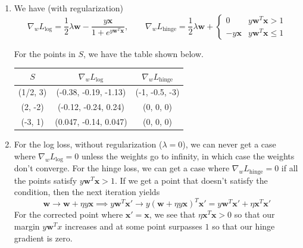\documentclass[12pt]{article}
\newcommand{\x}{\mathbf x}
\newcommand{\w}{\mathbf w}
\begin{document}
\begin{enumerate}[leftmargin=*]
\begin{enumerate}[label = \Alph*.]
\begin{figure}[h]
\begin{subfigure}[t]{0.45\textwidth}
\caption{Squared Error}
\end{subfigure}
\end{figure}
\item We have (with regularization)
\[ \nabla_w L_{\text{log}} = \frac{1}{2} \lambda \w - \frac{y \x}{1 + e^{y \w^T \x}}, \qquad \nabla_w L_{\text{hinge}} = \frac{1}{2} \lambda \w + \begin{cases} 0 & y \w^T \x > 1 \\ -y \x & y \w^T \x \leq 1 \end{cases} \]

For the points in $S$, we have the table shown below.
\begin{center}
\begin{tabular}{|c c c|}
\hline
$S$ & $\nabla_w L_{\text{log}}$ & $\nabla_w L_{\text{hinge}}$ \\ \hline
(1/2, 3) & (-0.38, -0.19, -1.13) & (-1, -0.5, -3) \\
(2, -2) & (-0.12, -0.24, 0.24) & (0, 0, 0) \\
(-3, 1) & (0.047, -0.14, 0.047) & (0, 0, 0) \\ \hline
\end{tabular}
\end{center}
\item For the log loss, without regularization ($\lambda = 0$), we can never get a case where $\nabla_w L_{\text{log}} = 0$ unless the weights go to infinity, in which case the weights don't converge. For the hinge loss, we can get a case where $\nabla_w L_{\text{hinge}} = 0$ if all the points satisfy $y \w^T \x > 1$. If we get a point that doesn't satisfy the condition, then the next iteration yields
\[ \w \to \w + \eta y \x \implies y \w^T \x' \to y(\w + \eta y \x)^T \x' = y \w^T \x' + \eta \x^T \x' \]
For the corrected point where $\x' = \x$, we see that $\eta \x^T \x > 0$ so that our margin $y \w^T x$ increases and at some point surpasses $1$ so that our hinge gradient is zero.


\end{enumerate}
\end{enumerate}
\end{document}
